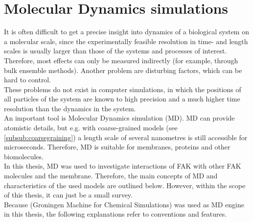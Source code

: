\section{Molecular Dynamics simulations}
It is often difficult to get a precise insight into dynamics of a biological system on a molecular scale, since the experimentally feasible resolution in time- and length scales is usually larger than those of the systems and processes of interest.
Therefore, most effects can only be measured indirectly (for example, through bulk ensemble methods). Another problem are disturbing factors, which can be hard to control.\\
These problems do not exist in computer simulations, in which the positions of all particles of the system are known to high precision and a much higher time resolution than the dynamics in the system.\\
An important tool is Molecular Dynamics simulation (MD). MD can provide atomistic details, but e.g. with coarse-grained models (see \autoref{subsub:coarsegraining}) a length scale of several nanometres is still accessible for microseconds. Therefore, MD is suitable for membranes, proteins and other biomolecules.\\
In this thesis, MD was used to investigate interactions of FAK with other FAK molecules and the membrane. Therefore, the main concepts of MD and characteristics of the used models are outlined below. However, within the scope of this thesis, it can just be a small survey.\\
Because \gromacs{} (Groningen Machine for Chemical Simulations) \autocites{gromacs1, gromacsManual} was used as MD engine in this thesis, the following explanations refer to \gromacs{} conventions and features.
